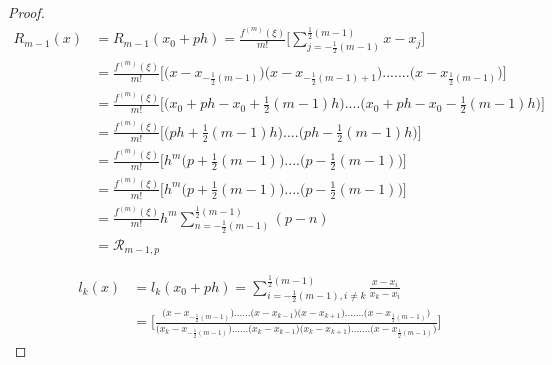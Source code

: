 \documentclass[../document.tex]{subfiles}
\begin{document}
\begin{appendices}
\begin{proof}
			\begin{equation}   \label{remainder_final}
				\begin{split}
					R_{m-1}(x) &=  R_{m-1}(x_0 + ph)  
					=\frac{ f^{(m)}(\xi) }{ m! }
					\bigg[  
					\sum_{j = -\frac{1}{2}(m-1) }^{ \frac{1}{2}(m-1) } 
					x-x_j
					\bigg] 
					\\
					&=\frac{ f^{(m)}(\xi) }{ m! }
					\bigg[  
					\Big(x - x_{-\frac{1}{2}(m-1)} \Big)
					\Big(x - x_{-\frac{1}{2}(m-1)+1} \Big)
					.......
					\Big(x - x_{\frac{1}{2}(m-1)} \Big)
					\bigg]  
					\\
					&=\frac{ f^{(m)}(\xi) }{ m! }
					\bigg[  
					\Big(
					x_0 +ph -x_0 + \frac{1}{2}(m-1)h
					\Big)
					....
					\Big(
					x_0 +ph -x_0 - \frac{1}{2}(m-1)h
					\Big)
					\bigg] 
					\\
					&=\frac{ f^{(m)}(\xi) }{ m! }
					\bigg[  
					\Big(
					ph + \frac{1}{2}(m-1)h
					\Big)
					....
					\Big(
					ph- \frac{1}{2}(m-1)h
					\Big)
					\bigg] 
					\\
					&=\frac{ f^{(m)}(\xi) }{ m! }
					\bigg[  
					h^{m}
					\Big(
					p + \frac{1}{2}(m-1)
					\Big)
					....
					\Big(
					p- \frac{1}{2}(m-1)
					\Big)
					\bigg] 
					\\
					&=\frac{ f^{(m)}(\xi) }{ m! }
					\bigg[  
					h^{m}
					\Big(
					p + \frac{1}{2}(m-1)
					\Big)
					....
					\Big(
					p- \frac{1}{2}(m-1)
					\Big)
					\bigg] 
					\\
					&=\frac{ f^{(m)}(\xi) }{ m! } h^{m}
					\sum_{n = -\frac{1}{2}(m-1)}^{\frac{1}{2}(m-1)}
					(p-n)
					\\
					&=\mathcal{R}_{m-1,p}
				\end{split}
			\end{equation}
			
			
			
			\begin{equation*}
				\begin{split}
					l_k(x) &=  l_k( x_0 + ph ) =
					\sum_{i = -\frac{1}{2}(m-1) , i \neq k}^{\frac{1}{2}(m-1)} 
					\frac{x - x_i}{x_k - x_i} 
					\\
					&=\Bigg[\frac{
						\big(x  - x_{-\frac{1}{2}(m-1)} \big)
						......
						\big(x  - x_{k-1} \big)
						\big(x  - x_{k+1} \big)
						.......
						\big(x - x_{\frac{1}{2}(m-1)} \big)
					}{
						\big(x_k - x_{-\frac{1}{2}(m-1)} \big)
						......
						\big(x_k  - x_{k-1} \big)
						\big(x_k  - x_{k+1} \big)
						.......
						\big(x - x_{\frac{1}{2}(m-1)} \big)
					}
					\Bigg]
				\end{split}
			\end{equation*}
			

\end{proof}
\end{appendices}
\end{document}

